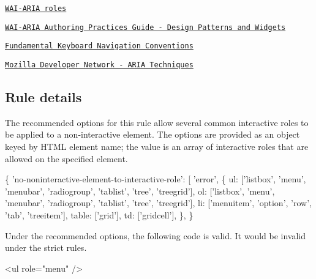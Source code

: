\begin{DoxyEnumerate}
\item \href{https://www.w3.org/TR/wai-aria-1.1/#usage_intro}{\tt W\+A\+I-\/\+A\+R\+IA roles}
\end{DoxyEnumerate}
\begin{DoxyEnumerate}
\item \href{https://www.w3.org/TR/wai-aria-practices-1.1/#aria_ex}{\tt W\+A\+I-\/\+A\+R\+IA Authoring Practices Guide -\/ Design Patterns and Widgets}
\end{DoxyEnumerate}
\begin{DoxyEnumerate}
\item \href{https://www.w3.org/TR/wai-aria-practices-1.1/#kbd_generalnav}{\tt Fundamental Keyboard Navigation Conventions}
\end{DoxyEnumerate}
\begin{DoxyEnumerate}
\item \href{https://developer.mozilla.org/en-US/docs/Web/Accessibility/ARIA/ARIA_Techniques/Using_the_button_role#Keyboard_and_focus}{\tt Mozilla Developer Network -\/ A\+R\+IA Techniques}
\end{DoxyEnumerate}

\subsection*{Rule details}

The recommended options for this rule allow several common interactive roles to be applied to a non-\/interactive element. The options are provided as an object keyed by H\+T\+ML element name; the value is an array of interactive roles that are allowed on the specified element.


\begin{DoxyCode}
\{
  'no-noninteractive-element-to-interactive-role': [
  'error',
  \{
    ul: ['listbox', 'menu', 'menubar', 'radiogroup', 'tablist', 'tree', 'treegrid'],
    ol: ['listbox', 'menu', 'menubar', 'radiogroup', 'tablist', 'tree', 'treegrid'],
    li: ['menuitem', 'option', 'row', 'tab', 'treeitem'],
    table: ['grid'],
    td: ['gridcell'],
  \},
\}
\end{DoxyCode}


Under the recommended options, the following code is valid. It would be invalid under the strict rules.


\begin{DoxyCode}
<ul role="menu" />
\end{DoxyCode}
 